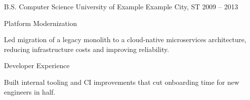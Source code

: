 \documentclass[11pt, a4paper]{awesome-cv}
\begin{document}
\begin{cvskills}
\end{cvskills}

\begin{cventries}
  \cventry
    {B.S. Computer Science}
    {University of Example}
    {Example City, ST}
    {2009 -- 2013}
    {}
\end{cventries}

\begin{cventries}
  \cventry
    {Platform Modernization}
    {}
    {}
    {}
    {
      \begin{cvitems}
        \item {Led migration of a legacy monolith to a cloud-native microservices architecture, reducing infrastructure costs and improving reliability.}
      \end{cvitems}
    }
  \cventry
    {Developer Experience}
    {}
    {}
    {}
    {
      \begin{cvitems}
        \item {Built internal tooling and CI improvements that cut onboarding time for new engineers in half.}
      \end{cvitems}
    }
\end{cventries}
\end{document}
